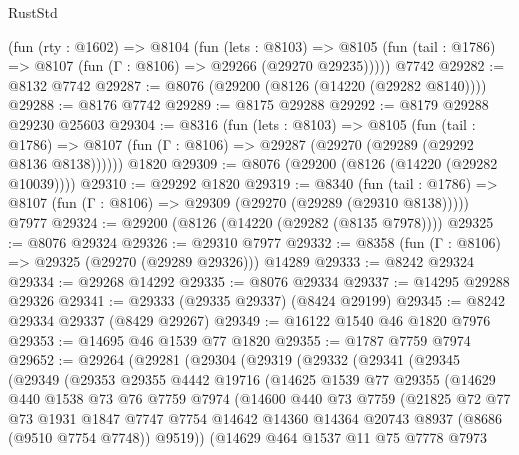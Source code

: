\begin{lexlean}{RustStd}
\begin{coremodule}
    (fun (rty : @1602) =>
    @8104
      (fun (lets : @8103) =>
      @8105 (fun (tail : @1786) => @8107 (fun (Γ : @8106) => @29266 (@29270 @29235)))))
    @7742
@29282 := @8132 @7742
@29287 := @8076 (@29200 (@8126 (@14220 (@29282 @8140))))
@29288 := @8176 @7742
@29289 := @8175 @29288
@29292 := @8179 @29288 @29230 @25603
@29304 := @8316
    (fun (lets : @8103) =>
    @8105
      (fun (tail : @1786) =>
      @8107 (fun (Γ : @8106) => @29287 (@29270 (@29289 (@29292 @8136 @8138))))))
    @1820
@29309 := @8076 (@29200 (@8126 (@14220 (@29282 @10039))))
@29310 := @29292 @1820
@29319 := @8340
    (fun (tail : @1786) => @8107 (fun (Γ : @8106) => @29309 (@29270 (@29289 (@29310 @8138)))))
    @7977
@29324 := @29200 (@8126 (@14220 (@29282 (@8135 @7978))))
@29325 := @8076 @29324
@29326 := @29310 @7977
@29332 := @8358 (fun (Γ : @8106) => @29325 (@29270 (@29289 @29326))) @14289
@29333 := @8242 @29324
@29334 := @29268 @14292
@29335 := @8076 @29334
@29337 := @14295 @29288 @29326
@29341 := @29333 (@29335 @29337) (@8424 @29199)
@29345 := @8242 @29334 @29337 (@8429 @29267)
@29349 := @16122 @1540 @46 @1820 @7976
@29353 := @14695 @46 @1539 @77 @1820
@29355 := @1787 @7759 @7974
@29652 := @29264
    (@29281
      (@29304
        (@29319
          (@29332
            (@29341
              (@29345
                (@29349
                  (@29353
                    @29355
                    @4442
                    @19716
                    (@14625
                      @1539
                      @77
                      @29355
                      (@14629
                        @440
                        @1538
                        @73
                        @76
                        @7759
                        @7974
                        (@14600
                          @440
                          @73
                          @7759
                          (@21825
                            @72
                            @77
                            @73
                            @1931
                            @1847
                            @7747
                            @7754
                            @14642
                            @14360
                            @14364
                            @20743
                            @8937
                            (@8686 (@9510 @7754 @7748))
                            @9519))
                        (@14629
                          @464
                          @1537
                          @11
                          @75
                          @7778
                          @7973

\end{coremodule}
\end{lexlean}
